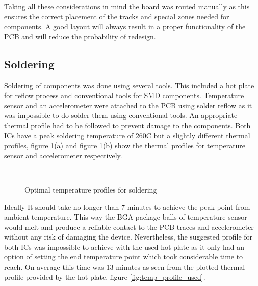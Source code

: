 Taking all these considerations in mind the board was routed manually as this ensures the correct placement of the tracks and special zones needed for components. A good layout will always result in a proper functionality of the PCB and will reduce the probability of redesign.


\subsection{Soldering}
Soldering of components was done using several tools. This included a hot plate for reflow process and conventional tools for SMD components. Temperature sensor and an accelerometer were attached to the PCB using solder reflow as it was impossible to do solder them using conventional tools. An appropriate thermal profile had to be followed to prevent damage to the components. Both ICs have a peak soldering temperature of 260C but a slightly different thermal profiles, figure \ref{fig:temp_profile_optimal}(a) and figure  \ref{fig:temp_profile_optimal}(b) show the thermal profiles for temperature sensor and accelerometer respectively. 

\begin{figure}
\centering
\mbox{
\quad
{}
}
\caption{Optimal temperature profiles for soldering}
\label{fig:temp_profile_optimal}
\end{figure}

Ideally It should take no longer than 7 minutes to achieve the peak point from ambient temperature. This way the BGA package balls of temperature sensor would melt and produce a reliable contact to the PCB traces and accelerometer  without any risk of damaging the device. Nevertheless, the suggested profile for both ICs was impossible to achieve with the used hot plate as it only had an option of setting the end temperature point which took considerable time to reach. On average this time was 13 minutes as seen from the plotted thermal profile provided by the hot plate, figure \ref{fig:temp_profile_used}.


